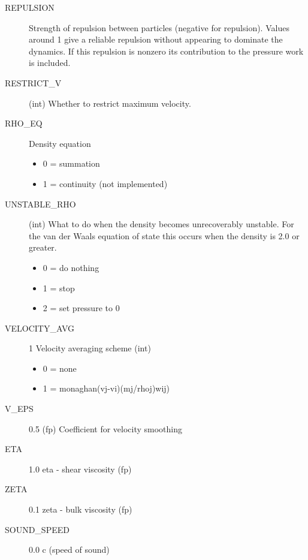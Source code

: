 \begin{description}
\item[REPULSION] Strength of repulsion between particles (negative for
    repulsion). Values around 1 give a reliable repulsion without appearing to
    dominate the dynamics. If this repulsion is nonzero its contribution to the
    pressure work is included.

\item[RESTRICT\_V] (int)  Whether to restrict maximum velocity.

\item[RHO\_EQ]      Density equation
    \begin{itemize}
    \item 0 = summation
    \item 1 = continuity (not implemented)
    \end{itemize}

\item[UNSTABLE\_RHO]  (int)  What to do when the density becomes unrecoverably
    unstable. For the van der Waals equation of state this occurs when the density
    is 2.0 or greater. 
    \begin{itemize}
    \item 0 = do nothing
    \item 1 = stop
    \item 2 = set pressure to 0 
    \end{itemize}

\item[VELOCITY\_AVG] 1    Velocity averaging scheme  (int)
    \begin{itemize}
    \item 0 = none 
    \item 1 = monaghan(vj-vi)(mj/rhoj)wij) \cite[]{monaghan_smoothed_1992}
    \end{itemize}

\item[V\_EPS] 0.5 (fp)   Coefficient for velocity smoothing
\item[ETA] 1.0  eta - shear viscosity (fp)
\item[ZETA] 0.1  zeta - bulk viscosity (fp)
\item[SOUND\_SPEED] 0.0  c (speed of sound)
\end{description}

